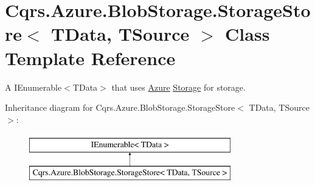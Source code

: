 \hypertarget{classCqrs_1_1Azure_1_1BlobStorage_1_1StorageStore}{}\section{Cqrs.\+Azure.\+Blob\+Storage.\+Storage\+Store$<$ T\+Data, T\+Source $>$ Class Template Reference}
\label{classCqrs_1_1Azure_1_1BlobStorage_1_1StorageStore}


A I\+Enumerable$<$\+T\+Data$>$ that uses \hyperlink{namespaceCqrs_1_1Azure}{Azure} \hyperlink{namespaceCqrs_1_1Azure_1_1Storage}{Storage} for storage.  


Inheritance diagram for Cqrs.\+Azure.\+Blob\+Storage.\+Storage\+Store$<$ T\+Data, T\+Source $>$\+:\begin{figure}[H]
\begin{center}
\leavevmode
\includegraphics[height=2.000000cm]{classCqrs_1_1Azure_1_1BlobStorage_1_1StorageStore}
\end{center}
\end{figure}
